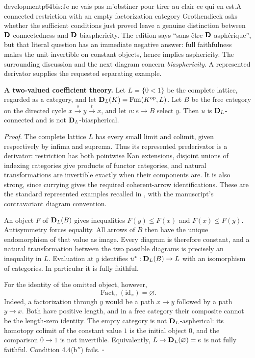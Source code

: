\begin{dcomment}{development}{p64bis:Je ne vais pas m'obstiner pour tirer au clair ce qui en est.}{A connected restriction with an empty factorization category}
Grothendieck asks whether the sufficient conditions just proved leave a genuine distinction between $\mathbf{D}$-connectedness and $\mathbf{D}$-biasphericity. The edition says ``sans être $\mathbf{D}$-asphérique'', but that literal question has an immediate negative answer: full faithfulness makes the unit invertible on constant objects, hence implies asphericity. The surrounding discussion and the next diagram concern \emph{biasphericity}. A represented derivator supplies the requested separating example.

\textbf{A two-valued coefficient theory.}\ours{}
Let $L=\{0<1\}$ be the complete lattice, regarded as a category, and let $\mathbf{D}_L(K)=\operatorname{Fun}(K^{\mathrm{op}},L)$. Let $B$ be the free category on the directed cycle $x\xrightarrow{s}y\xrightarrow{t}x$, and let $u:e\to B$ select $y$. Then $u$ is $\mathbf{D}_L$-connected and is not $\mathbf{D}_L$-biaspherical.

\emph{Proof.} The complete lattice $L$ has every small limit and colimit, given respectively by infima and suprema. Thus its represented prederivator is a derivator: restriction has both pointwise Kan extensions, disjoint unions of indexing categories give products of functor categories, and natural transformations are invertible exactly when their components are. It is also strong, since currying gives the required coherent-arrow identifications. These are the standard represented examples recalled in \citet[Examples 1.2(1), 1.6 and Definitions 1.5, 1.8]{Groth2013}, with the manuscript's contravariant diagram convention.

An object $F$ of $\mathbf{D}_L(B)$ gives inequalities $F(y)\leq F(x)$ and $F(x)\leq F(y)$. Antisymmetry forces equality. All arrows of $B$ then have the unique endomorphism of that value as image. Every diagram is therefore constant, and a natural transformation between the two possible diagrams is precisely an inequality in $L$. Evaluation at $y$ identifies $u^*:\mathbf{D}_L(B)\to L$ with an isomorphism of categories. In particular it is fully faithful.

For the identity of the omitted object, however,
\[
        \operatorname{Fact}_u(\mathrm{id}_x)=\varnothing.
\]
Indeed, a factorization through $y$ would be a path $x\to y$ followed by a path $y\to x$. Both have positive length, and in a free category their composite cannot be the length-zero identity. The empty category is not $\mathbf{D}_L$-aspherical: its homotopy colimit of the constant value $1$ is the initial object $0$, and the comparison $0\to1$ is not invertible. Equivalently, $L\to\mathbf{D}_L(\varnothing)=e$ is not fully faithful. Condition 4.4(b$''$) fails. \hfill$\square$


\end{dcomment}
